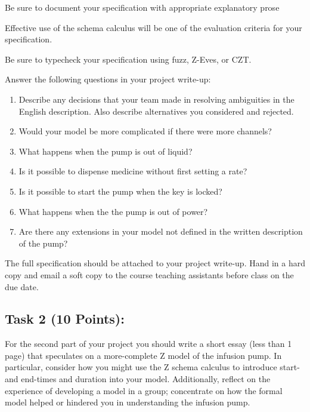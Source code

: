\documentclass{article}
\newcommand{\head}{\subsection*}
\begin{document}
\bigskip Be sure to document your specification with appropriate explanatory prose

\bigskip Effective use of the schema calculus will be one of the evaluation criteria for your specification.

\bigskip Be sure to typecheck your specification using fuzz,
Z-Eves, or CZT.

\bigskip Answer the following questions in your project write-up:
\begin{enumerate}
    \item Describe any decisions that your team made in resolving
    ambiguities in the English description. Also describe
    alternatives you considered and rejected.
    \item Would your model be more complicated if there were more
    channels?
    \item What happens when the pump is out of liquid?
    \item Is it possible to dispense medicine without first
    setting a rate?
    \item Is it possible to start the pump when the key is locked?
    \item What happens when the the pump is out of power?
    \item Are there any extensions in your model not defined in
    the written description of the pump?
\end{enumerate}

\noindent The full specification should be attached to your project
write-up. Hand in a hard copy and email a soft copy to the course
teaching assistants before class on the due date.

\head{Task 2 (10 Points):}

For the second part of your project you should write a short essay
(less than 1 page) that speculates on a more-complete Z model of the infusion pump. In particular, consider how you might use the Z schema calculus to introduce start- and end-times and duration into your model.
Additionally, reflect on the experience of developing a model in a
group; concentrate on how the formal model helped or hindered you in
understanding the infusion pump.
\end{document}
